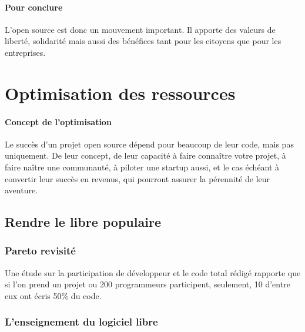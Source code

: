 		\paragraph{Pour conclure\\}

			L’open source est donc un mouvement important. Il apporte des valeurs de liberté, solidarité mais aussi des bénéfices tant pour les citoyens que pour les entreprises. 
		
	\section{Optimisation des ressources} %

		\paragraph{Concept de l'optimisation\\}

	 		Le succès d'un projet open source dépend pour beaucoup de leur code, mais pas uniquement. De leur concept, de leur capacité à faire connaître votre projet, à faire naître une communauté, à piloter une startup aussi, et le cas échéant à convertir leur succès en revenus, qui pourront assurer la pérennité de leur aventure.

		\subsection{Rendre le libre populaire}

			\subsubsection{Pareto revisité}
			Une étude sur la participation de développeur et le code total rédigé rapporte que si l'on prend un projet ou 200 programmeurs participent, seulement, 10 d'entre eux ont écris 50\% du code.

			\subsubsection{L'enseignement du logiciel libre}

